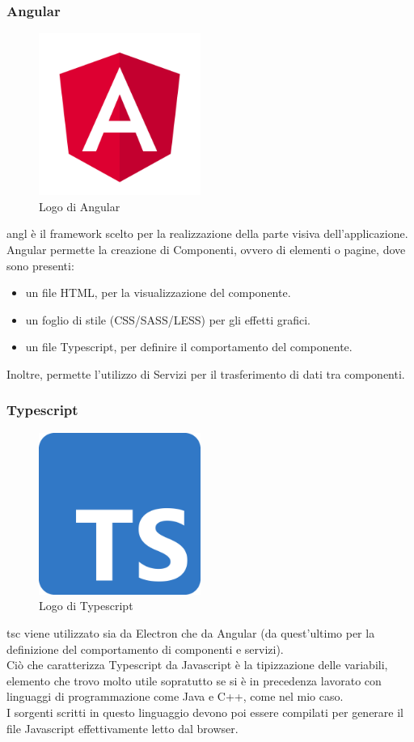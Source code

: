 \subsubsection{Angular}
\label{subsec:angular}
\begin{figure}[h]
    \centering
    \includegraphics[width=150pt]{images/technologies/angular.png}
    \caption{Logo di Angular}
    \label{fig:angular}
\end{figure}
\gls{angl} è il framework scelto per la realizzazione della parte visiva dell'applicazione.\\
Angular permette la creazione di Componenti, ovvero di elementi o pagine, dove sono presenti:
\begin{itemize}
    \item un file HTML, per la visualizzazione del componente.
    \item un foglio di stile (CSS/SASS/LESS) per gli effetti grafici.
    \item un file Typescript, per definire il comportamento del componente.
\end{itemize}
Inoltre, permette l'utilizzo di Servizi per il trasferimento di dati tra componenti.
\subsubsection{Typescript}
\begin{figure}[h]
    \centering
    \includegraphics[width=150pt]{images/technologies/typescript.png}
    \caption{Logo di Typescript}
    \label{fig:typescript}
\end{figure}
\gls{tsc} viene utilizzato sia da Electron che da Angular (da quest'ultimo per la definizione del comportamento di componenti e servizi).\\
Ciò che caratterizza Typescript da Javascript è la tipizzazione delle variabili, elemento che trovo molto utile sopratutto se si è in precedenza lavorato con linguaggi di programmazione come Java e C++, come nel mio caso.\\
I sorgenti scritti in questo linguaggio devono poi essere compilati per generare il file Javascript effettivamente letto dal browser.

